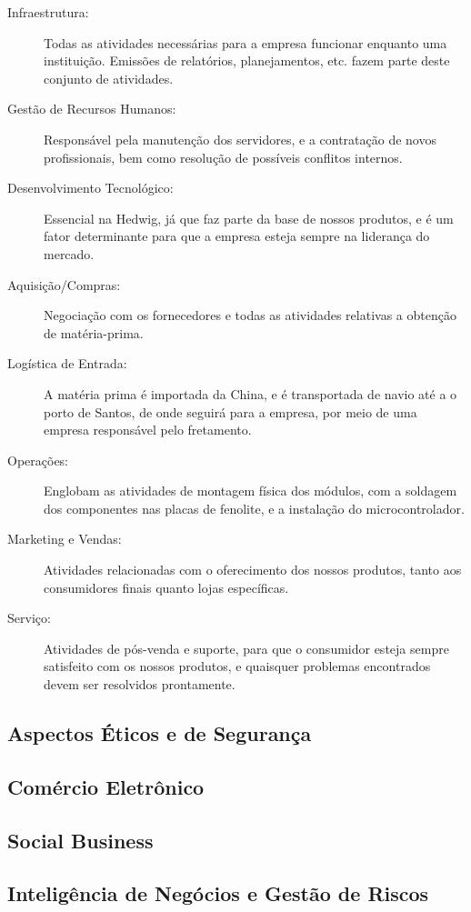 \begin{description}
    \item[Infraestrutura:]Todas as atividades necessárias para a empresa funcionar enquanto uma instituição. Emissões de relatórios, planejamentos, etc. fazem parte deste conjunto de atividades.

    \item[Gestão de Recursos Humanos:]Responsável pela manutenção dos servidores, e a contratação de novos profissionais, bem como resolução de possíveis conflitos internos.

    \item[Desenvolvimento Tecnológico:]Essencial na Hedwig, já que faz parte da base de nossos produtos, e é um fator determinante para que a empresa esteja sempre na liderança do mercado.

    \item[Aquisição/Compras:]Negociação com os fornecedores e todas as atividades relativas a obtenção de matéria-prima.

    \item[Logística de Entrada:]A matéria prima é importada da China, e é transportada de navio até a o porto de Santos, de onde seguirá para a empresa, por meio de uma empresa responsável pelo fretamento.

    \item[Operações:]Englobam as atividades de montagem física dos módulos, com a soldagem dos componentes nas placas de fenolite, e a instalação do microcontrolador.

    \item[Marketing e Vendas:]Atividades relacionadas com o oferecimento dos nossos produtos, tanto aos consumidores finais quanto lojas específicas.

    \item[Serviço:]Atividades de pós-venda e suporte, para que o consumidor esteja sempre satisfeito com os nossos produtos, e quaisquer problemas encontrados devem ser resolvidos prontamente.
\end{description}

\subsection{Aspectos Éticos e de Segurança}

\subsection{Comércio Eletrônico}

\subsection{Social Business}

\subsection{Inteligência de Negócios e Gestão de Riscos}